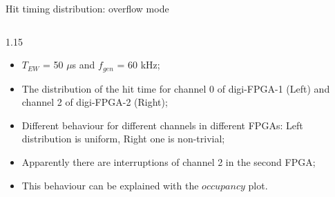 \documentclass{beamer}
\begin{document}
\begin{frame}{Hit timing distribution: overflow mode}
\begin{columns}
\begin{column}{1.15\framewidth}
     \begin{itemize}
        \item $T_{EW}$ = 50 $\mu$s and $f_{gen}$ = 60 kHz;
     \item The distribution of the hit time for channel 0 of digi-FPGA-1 (Left) and channel 2 of digi-FPGA-2 (Right);
     \item Different behaviour for different channels in different FPGAs: Left distribution is uniform, Right one is non-trivial;
        \item Apparently there are interruptions of channel 2 in the second FPGA;
        \item This behaviour can be explained with the $occupancy$ plot.
    \end{itemize}
         \end{column}
\end{columns}   
\end{frame}
\end{document}
